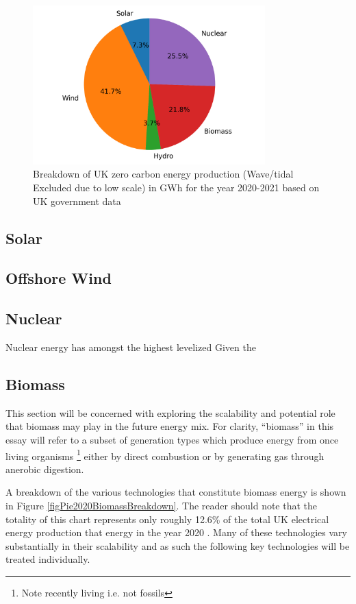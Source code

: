 \documentclass[11pt]{article}
\numberwithin{equation}{section}
\begin{document}
\begin{figure}[H]
\centering
\includegraphics[width=0.8\textwidth]{./.ob-jupyter/9d5f54f66e0860cfcadd03202a7835f8eee375c2.png}
\caption{\label{figPie2020CumGen}Breakdown of UK zero carbon energy production (Wave/tidal Excluded due to low scale) in GWh for the year 2020-2021 based on UK government data \cite{RenewableElecricityCap}}
\end{figure}

\subsection{Solar}
\label{sec:orgaeda9e6}
\subsection{Offshore Wind}
\label{sec:orga7acf60}
\subsection{Nuclear}
\label{sec:orgbd698d4}
Nuclear energy has amongst the highest levelized
Given the
\subsection{Biomass \label{secBioGas}}
\label{sec:orgc15d623}
This section will be concerned with exploring the scalability and potential role that biomass may play in the future energy mix. For clarity, ``biomass'' in this essay will refer to a subset of generation types which produce energy from once living organisms \footnote{Note recently living i.e. not fossils} either by direct combustion or by generating gas through anerobic digestion.

A breakdown of the various technologies that constitute biomass energy is shown in Figure \ref{figPie2020BiomassBreakdown}. The reader should note that the totality of this chart represents only roughly 12.6\% of the total UK electrical energy production that energy in the year 2020 \cite{BiomassPolicyStatement}. Many of these technologies vary substantially in their scalability and as such the following key technologies will be treated individually.
\end{document}
